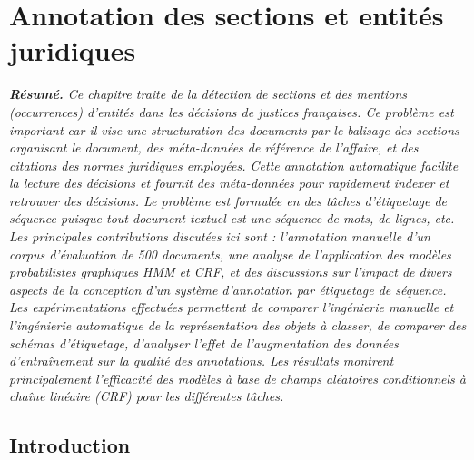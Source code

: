 \chapter{Annotation des sections et entités juridiques}
\label{chap:structuration}


\textit{\small \textbf{Résumé.} Ce chapitre traite de la détection de sections et des mentions (occurrences) d'entités dans les décisions de justices françaises. Ce problème est important car il vise une structuration des documents par le balisage des sections organisant le document, des méta-données de référence de l'affaire, et des citations des normes juridiques employées. Cette annotation automatique facilite la lecture des décisions et fournit des méta-données pour rapidement indexer et retrouver des  décisions. Le problème est formulée en des tâches d'étiquetage de séquence puisque tout document textuel est une séquence de mots, de lignes, etc. Les principales contributions discutées ici sont : l'annotation manuelle d'un corpus d'évaluation de 500 documents, une analyse de l'application des modèles probabilistes graphiques HMM et CRF, et des discussions sur l'impact de divers aspects de la conception d'un système d'annotation par étiquetage de séquence. Les expérimentations effectuées permettent de comparer l'ingénierie manuelle et l'ingénierie automatique de la représentation des objets à classer, de comparer des schémas d'étiquetage, d'analyser l'effet de l'augmentation des données d'entraînement sur la qualité des annotations. Les résultats montrent principalement l'efficacité des modèles à base de champs aléatoires conditionnels à chaîne linéaire (CRF) pour les différentes tâches.}


\section{Introduction}
\label{sec:structuration:motivation}

